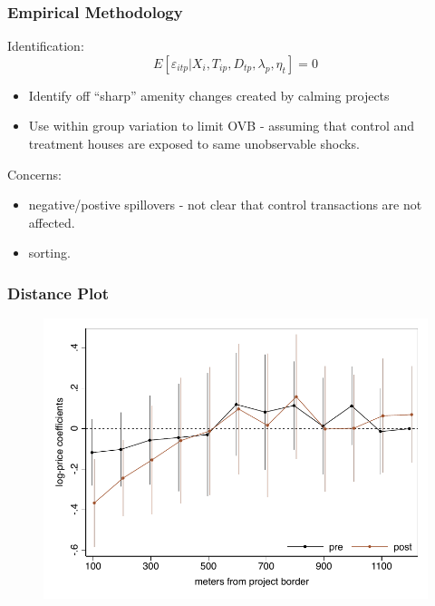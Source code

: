 \documentclass[aspectratio=149]{beamer}
\begin{document}
\begin{frame}
\frametitle{Empirical Methodology}
Identification:
\begin{equation*}
E[\varepsilon_{itp}|X_{i},T_{ip},D_{tp},\lambda_p,\eta_{t}]=0
\end{equation*}
\begin{itemize}
\item Identify off ``sharp'' amenity changes created by calming projects
\item Use within group variation to limit OVB - assuming that control and treatment houses are exposed to same unobservable shocks.
\end{itemize}
Concerns:
\begin{itemize}
\item negative/postive spillovers - not clear that control transactions are not affected.
\item sorting.
\end{itemize}
\end{frame}

\begin{frame}
\frametitle{Distance Plot}
\begin{center}
\begin{figure}
\includegraphics[scale=0.72]{distplot.pdf}
\vspace{-3mm}
\end{figure}
\end{center}
\end{frame}


\end{document}
